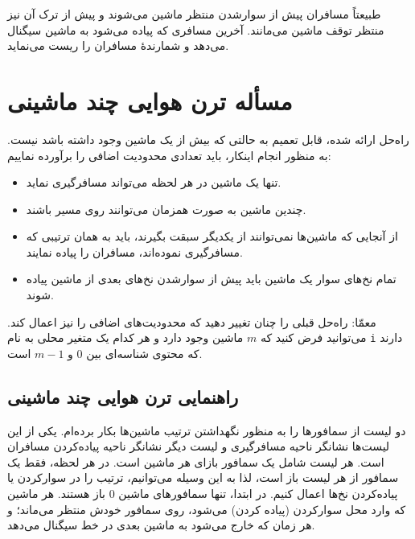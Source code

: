 \documentclass{book}
\newcommand{\clearemptydoublepage}{}%
\begin{document}
    طبیعتاً مسافران پیش از سوارشدن منتظر ماشین می‌شوند و پیش از ترک آن نیز منتظر توقف ماشین می‌مانند. 
    آخرین مسافری که پیاده می‌شود به ماشین سیگنال می‌دهد و شمارندهٔ مسافران را ریست می‌نماید. 


\clearemptydoublepage
\section{مسأله ترن هوایی چند ماشینی}

    راه‌حل ارائه شده، قابل تعمیم به حالتی که بیش از یک ماشین وجود داشته باشد نیست. به منظور انجام اینکار، باید تعدادی محدودیت اضافی را برآورده نماییم:

\begin{itemize}

\item 
    تنها یک ماشین در هر لحظه می‌تواند مسافرگیری نماید.

\item 
    چندین ماشین به صورت همزمان می‌توانند روی مسیر باشند. 

\item 
    از آنجایی که ماشین‌ها نمی‌توانند از یکدیگر سبقت بگیرند، باید به همان ترتیبی که مسافرگیری نموده‌اند، مسافران را پیاده نمایند. 

\item 
    تمام نخ‌های سوار یک ماشین باید پیش از سوارشدن نخ‌های بعدی از ماشین پیاده شوند.
\end{itemize}

    معمّا: راه‌حل قبلی را چنان تغییر دهید که محدودیت‌های اضافی را نیز اعمال کند. 
    می‌توانید فرض کنید که  $m$ ماشین وجود دارد و هر کدام یک متغیر محلی به نام {\tt i} دارند که محتوی شناسه‌‌ای بین 0 و  $m-1$ است. 


\clearemptydoublepage
\subsection{راهنمایی ترن هوایی چند ماشینی}

    دو لیست از سمافورها را به منظور نگهداشتن ترتیب ماشین‌ها بکار برده‌ام. یکی از این لیست‌ها نشانگر ناحیه مسافرگیری و لیست دیگر 
    نشانگر ناحیه پیاده‌کردن مسافران است. هر لیست شامل یک سمافور بازای هر ماشین است. در هر لحظه، فقط یک سمافور از هر لیست باز است، 
    لذا به این وسیله می‌توانیم، ترتیب را در سوارکردن یا پیاده‌کردن نخ‌ها اعمال کنیم. در ابتدا، تنها سمافورهای ماشین $0$ باز هستند. 
    هر ماشین که وارد محل سوارکردن (پیاده کردن) می‌شود،‌ روی سمافور خودش منتظر می‌ماند؛ و هر زمان که خارج می‌شود به ماشین 
    بعدی در خط سیگنال می‌دهد. 
\end{document}
